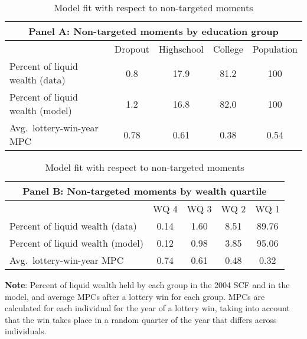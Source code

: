 \documentclass[qe]{econsocart}
\begin{document}
\begin{table}[tb] 
  \caption{Model fit with respect to non-targeted moments}
  \label{tab:nonTargetedMoments} 
  \centering

  \centering
  \begin{tabular}{lcccc}
    \multicolumn{5}{c}{\small Panel A: Non-targeted moments by education group}    \\
    \hline
                                     & Dropout & Highschool & College & Population \\
    \hline
    Percent of liquid wealth (data)  & 0.8     & 17.9       & 81.2    & 100        \\
    Percent of liquid wealth (model) & 1.2     & 16.8       & 82.0    & 100        \\
    \hline
    Avg.\ lottery-win-year MPC       & 0.78    & 0.61       & 0.38    & 0.54       \\
    \hline
  \end{tabular}

  \vspace{0.5em}

  \centering
  \begin{tabular}{lcccc}
    \multicolumn{5}{c}{\small Panel B: Non-targeted moments by wealth quartile} \\
    \hline
                                     & WQ 4 & WQ 3 & WQ 2 & WQ 1                \\
    \hline
    Percent of liquid wealth (data)  & 0.14 & 1.60 & 8.51 & 89.76               \\
    Percent of liquid wealth (model) & 0.12 & 0.98 & 3.85 & 95.06               \\
    \hline
    Avg.\ lottery-win-year MPC       & 0.74 & 0.61 & 0.48 & 0.32                \\
    \hline
  \end{tabular}

  \vspace{0.5em}
  \noindent\parbox{\textwidth}{\footnotesize
    \textbf{Note}: Percent of liquid wealth held by each group in the 2004 SCF and in the model, and average MPCs after a lottery win for each group. MPCs are calculated for each individual for the year of a lottery win, taking into account that the win takes place in a random quarter of the year that differs across individuals.}

  \vspace{0.5em}

\end{table}
\end{document}
